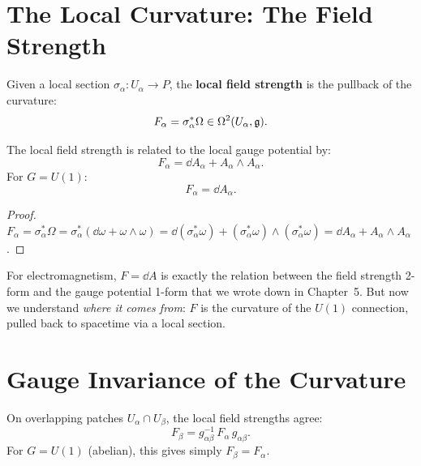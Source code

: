 \section{The Local Curvature: The Field Strength}

\begin{definition}
Given a local section $\sigma_\alpha: U_\alpha \to P$, the \textbf{local field strength} is the pullback of the curvature:
\begin{equation}
F_\alpha = \sigma_\alpha^*\Omega \in \Omega^2(U_\alpha, \mathfrak{g}).
\end{equation}
\end{definition}

\begin{theorem}
The local field strength is related to the local gauge potential by:
\begin{equation}
\boxed{F_\alpha = \dd A_\alpha + A_\alpha \wedge A_\alpha.}
\end{equation}
For $G = U(1)$:
\begin{equation}
F_\alpha = \dd A_\alpha.
\end{equation}
\end{theorem}

\begin{proof}
$F_\alpha = \sigma_\alpha^*\Omega = \sigma_\alpha^*(\dd\omega + \omega \wedge \omega) = \dd(\sigma_\alpha^*\omega) + (\sigma_\alpha^*\omega)\wedge(\sigma_\alpha^*\omega) = \dd A_\alpha + A_\alpha \wedge A_\alpha$.
\end{proof}

For electromagnetism, $F = \dd A$ is exactly the relation between the field strength 2-form and the gauge potential 1-form that we wrote down in Chapter~5. But now we understand \emph{where it comes from}: $F$ is the curvature of the $U(1)$ connection, pulled back to spacetime via a local section.

\section{Gauge Invariance of the Curvature}

\begin{theorem}
On overlapping patches $U_\alpha \cap U_\beta$, the local field strengths agree:
\begin{equation}
F_\beta = g_{\alpha\beta}^{-1}\,F_\alpha\,g_{\alpha\beta}.
\end{equation}
For $G = U(1)$ (abelian), this gives simply $F_\beta = F_\alpha$.
\end{theorem}

